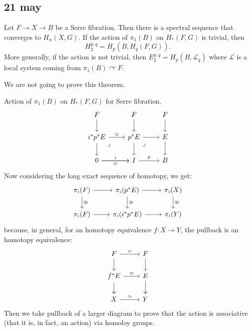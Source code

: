 \documentclass{article}
\newcommand{\Lc}{\mathcal{L}}
\begin{document}
\subsection{21 may}
\begin{thm}
	Let $F\to X\to B$ be a Serre fibration. Then there is a spectral sequence that converges to $H_n(X,G)$. If the action of $\pi_1(B)$ on $H_*(F,G)$ is trivial, then
	\[H^{p,q}_2=H_p(B,H_q(F,G)).\]
	More generally, if the action is not trivial, then $E^{p,q}_2=H_p(B,\Lc_q)$ where $\Lc$ is a local system coming from $\pi_1(B)\curvearrowright F$.
\end{thm}
We are not going to prove this theorem.
\begin{defn}
	Action of $\pi_1(B)$ on $H_*(F,G)$ for Serre fibration.
	\[\begin{tikzcd}
		F\arrow[d]&F\arrow[d]&F\arrow[d]\\
		i^*p^*E\arrow[r,"\simeq"]\arrow[d]\arrow[dr,phantom,very near start,"\lrcorner"]&p^*E\arrow[r]\arrow[d]\arrow[dr,phantom,very near start,"\lrcorner"]&E\arrow[d]\\
		0\arrow[r,"i"]\arrow[r,"\simeq",swap]&I\arrow[r,"p"]&B
	\end{tikzcd}\]
	Now considering the long exact sequence of homotopy, we get:
	\[\begin{tikzcd}
		\pi_i(F)\arrow[d,"\cong"]\arrow[r]&\pi_i(p^*E)\arrow[r]\arrow[d,"\cong"]&\pi_i(X)\arrow[d,"\cong"]\\
		\pi_i(F)\arrow[r]&\pi_i(i^*p^*E)\arrow[r]&\pi_i(Y)
	\end{tikzcd}\]
	because, in general, for an homotopy equivalence $f:X\to Y$, the pullback is an homotopy equivalence:
	\[\begin{tikzcd}
		F\arrow[r,"="]\arrow[d]&F\arrow[d]\\
		f^*E\arrow[r,"\simeq"]\arrow[d,two heads]&E\arrow[d,two heads]\\
		X\arrow[r,"\simeq"]&Y
	\end{tikzcd}\]
	Then we take pullback of a larger diagram to prove that the action is associative (that it is, in fact, an action) via homoloy groups.
\end{defn}
\end{document}
